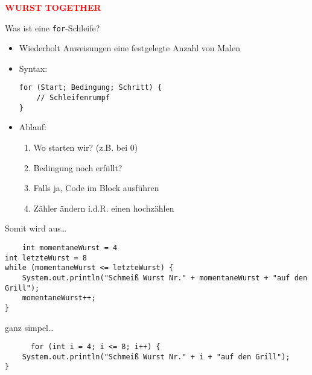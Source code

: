 \documentclass{../../presentation}
\begin{document}
\begin{frame}[plain]
  \centering
  {\Huge\bfseries\textcolor{red}{WURST TOGETHER}}
\end{frame}



\begin{frame}[fragile]{Was ist eine \texttt{for}-Schleife?}

  \begin{itemize}
    \item Wiederholt Anweisungen eine festgelegte Anzahl von Malen
    \item Syntax:
          \begin{verbatim}
for (Start; Bedingung; Schritt) {
    // Schleifenrumpf
}
\end{verbatim}
    \item Ablauf:
          \begin{enumerate}
            \item Wo starten wir? (z.B. bei 0)
            \item Bedingung noch erfüllt?
            \item Falls ja, Code im Block ausführen
            \item Zähler ändern i.d.R. einen hochzählen
          \end{enumerate}
  \end{itemize}
\end{frame}



\begin{frame}[fragile]
  Somit wird aus\dots

  \begin{verbatim}
    int momentaneWurst = 4
int letzteWurst = 8
while (momentaneWurst <= letzteWurst) {
	System.out.println("Schmeiß Wurst Nr." + momentaneWurst + "auf den Grill");
	momentaneWurst++;
}
  \end{verbatim}
  ganz simpel\dots
  \begin{verbatim}
      for (int i = 4; i <= 8; i++) {
	System.out.println("Schmeiß Wurst Nr." + i + "auf den Grill");
}
  \end{verbatim}

\end{frame}
\end{document}
